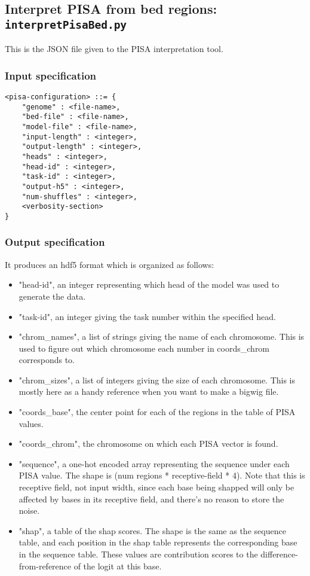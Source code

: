 \documentclass{article}
\begin{document}
\newpage
\subsection{Interpret PISA from bed regions: \texttt{interpretPisaBed.py}}

This is the JSON file given to the PISA interpretation tool. 

\subsubsection{Input specification}

\begin{lstlisting}
<pisa-configuration> ::= {
    "genome" : <file-name>,
    "bed-file" : <file-name>,
    "model-file" : <file-name>,
    "input-length" : <integer>,
    "output-length" : <integer>,
    "heads" : <integer>,
    "head-id" : <integer>,
    "task-id" : <integer>,
    "output-h5" : <integer>,
    "num-shuffles" : <integer>,
    <verbosity-section>
}
\end{lstlisting}

\subsubsection{Output specification}

It produces an hdf5 format which is organized as follows:

\begin{itemize}
    \item "head-id", an integer representing which head of the model was used to generate the data.
    \item "task-id", an integer giving the task number within the specified head. 
    \item "chrom\_names", a list of strings giving the name of each chromosome. This is used to figure out which chromosome each number in coords\_chrom corresponds to. 
    \item "chrom\_sizes", a list of integers giving the size of each chromosome. This is mostly here as a handy reference when you want to make a bigwig file. 
    \item "coords\_base", the center point for each of the regions in the table of PISA values. 
    \item "coords\_chrom", the chromosome on which each PISA vector is found. 
    \item "sequence", a one-hot encoded array representing the sequence under each PISA value. The shape is (num regions * receptive-field * 4). Note that this is receptive field, not input width, since each base being shapped will only be affected by bases in its receptive field, and there's no reason to store the noise. 
    \item "shap", a table of the shap scores. The shape is the same as the sequence table, and each position in the shap table represents the corresponding base in the sequence table. These values are contribution scores to the difference-from-reference of the logit at this base. 

\end{itemize}
\end{document}
